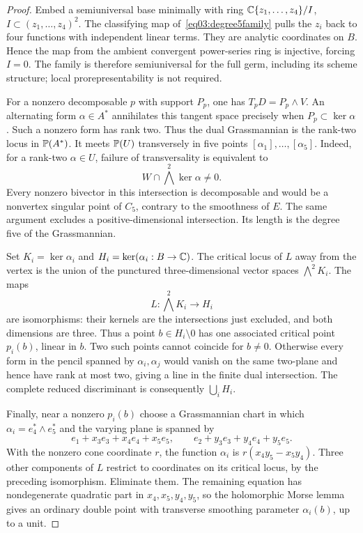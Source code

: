 \begin{proof}
Embed a semiuniversal base minimally with ring
$\mathbb{C}\{z_1,\ldots,z_4\}/I$, $I\subset(z_1,\ldots,z_4)^2$.
The classifying map of~\eqref{eq03:degree5family} pulls the $z_i$
back to four functions with independent linear terms.  They are
analytic coordinates on $B$.  Hence the map from the ambient
convergent power-series ring is injective, forcing $I=0$.
The family is therefore semiuniversal for the full germ, including
its scheme structure; local prorepresentability is not required.

For a nonzero decomposable $p$ with support $P_p$, one has
$T_pD=P_p\wedge V$.  An alternating form $\alpha\in A^*$
annihilates this tangent space precisely when
$P_p\subset\ker\alpha$.  Such a nonzero form has rank two.
Thus the dual Grassmannian is the rank-two locus in $\mathbb{P}(A^*)$.
It meets $\mathbb{P}(U)$ transversely in five points
$[\alpha_1],\ldots,[\alpha_5]$.  Indeed, for a rank-two
$\alpha\in U$, failure of transversality is equivalent to
\[
 W\cap\bigwedge^2\ker\alpha\ne0.
\]
Every nonzero bivector in this intersection is decomposable and
would be a nonvertex singular point of $C_5$, contrary to the
smoothness of $E$.  The same argument excludes a positive-dimensional
intersection.  Its length is the degree five of the Grassmannian.

Set $K_i=\ker\alpha_i$ and $H_i=\ker(\alpha_i:B\to\mathbb{C})$.
The critical locus of $L$ away from the vertex is the union of
the punctured three-dimensional vector spaces $\bigwedge^2K_i$.
The maps
\[
 L:\bigwedge^2K_i\longrightarrow H_i
\]
are isomorphisms: their kernels are the intersections just excluded,
and both dimensions are three.  Thus a point $b\in H_i\setminus0$
has one associated critical point $p_i(b)$, linear in $b$.
Two such points cannot coincide for $b\ne0$.  Otherwise every
form in the pencil spanned by $\alpha_i,\alpha_j$ would vanish
on the same two-plane and hence have rank at most two, giving a
line in the finite dual intersection.  The complete reduced
discriminant is consequently $\bigcup_iH_i$.

Finally, near a nonzero $p_i(b)$ choose a Grassmannian chart in
which $\alpha_i=e_4^*\wedge e_5^*$ and the varying plane is
spanned by
\[
 e_1+x_3e_3+x_4e_4+x_5e_5,\qquad
 e_2+y_3e_3+y_4e_4+y_5e_5.
\]
With the nonzero cone coordinate $r$, the function $\alpha_i$
is $r(x_4y_5-x_5y_4)$.  Three other components of $L$ restrict
to coordinates on its critical locus, by the preceding isomorphism.
Eliminate them.  The remaining equation has nondegenerate quadratic
part in $x_4,x_5,y_4,y_5$, so the holomorphic Morse lemma gives
an ordinary double point with transverse smoothing parameter
$\alpha_i(b)$, up to a unit.
\end{proof}

